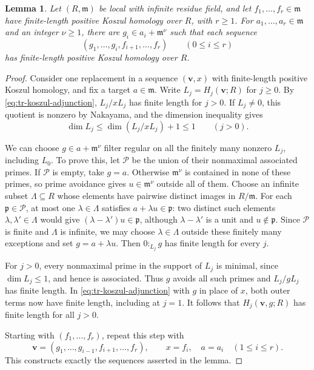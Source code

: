 \documentclass[11pt,reqno]{amsart}
\numberwithin{equation}{section}
\newtheorem{lemma}[theorem]{Lemma}
\theoremstyle{definition}
\begin{document}
\begin{lemma}
\label{lem:tr-successive-approximation}
Let $(R,\mathfrak m)$ be local with infinite residue field, and let
$f_1,\ldots,f_r\in\mathfrak m$ have finite-length positive Koszul
homology over $R$, with $r\ge1$.
For $a_1,\ldots,a_r\in\mathfrak m$ and an integer $\nu\geq1$, there are
$g_i\in a_i+\mathfrak m^\nu$ such that each sequence
\[
 (g_1,\ldots,g_i,f_{i+1},\ldots,f_r)\qquad(0\leq i\leq r)
\]
has finite-length positive Koszul homology over $R$.
\end{lemma}
\begin{proof}
Consider one replacement in a sequence $(\mathbf v,x)$ with
finite-length positive Koszul homology, and fix a target $a\in\mathfrak m$.
Write
$L_j=H_j(\mathbf v;R)$ for $j\geq0$.
By \eqref{eq:tr-koszul-adjunction}, $L_j/xL_j$ has finite length
for $j>0$. If $L_j\ne0$, this quotient is nonzero by Nakayama,
and the dimension inequality gives
\[
 \dim L_j\leq\dim(L_j/xL_j)+1\leq1\qquad(j>0).
\]

We can choose $g\in a+\mathfrak m^\nu$ filter regular on all the
finitely many nonzero $L_j$, including $L_0$.
To prove this, let $\mathcal P$ be the union of their nonmaximal
associated primes. If $\mathcal P$ is empty, take $g=a$.
Otherwise $\mathfrak m^\nu$ is contained in none of these primes,
so prime avoidance gives $u\in\mathfrak m^\nu$ outside all of them.
Choose an infinite subset $\Lambda\subseteq R$ whose elements have
pairwise distinct images in $R/\mathfrak m$.
For each $\mathfrak p\in\mathcal P$, at most one $\lambda\in\Lambda$
satisfies $a+\lambda u\in\mathfrak p$: two distinct such elements
$\lambda,\lambda'\in\Lambda$ would give
$(\lambda-\lambda')u\in\mathfrak p$, although $\lambda-\lambda'$
is a unit and $u\notin\mathfrak p$.
Since $\mathcal P$ is finite and $\Lambda$ is infinite, we may choose
$\lambda\in\Lambda$ outside these finitely many exceptions and set
$g=a+\lambda u$.
Then $0:_{L_j}g$ has finite length for every $j$.

For $j>0$, every nonmaximal prime in the support of $L_j$ is
minimal, since $\dim L_j\leq1$, and hence is associated.
Thus $g$ avoids all such primes and $L_j/gL_j$ has finite length.
In \eqref{eq:tr-koszul-adjunction} with $g$ in place of $x$,
both outer terms now have finite length, including at $j=1$.
It follows that $H_j(\mathbf v,g;R)$ has finite length for all $j>0$.

Starting with $(f_1,\ldots,f_r)$, repeat this step with
\[
 \mathbf v=(g_1,\ldots,g_{i-1},f_{i+1},\ldots,f_r),
 \qquad x=f_i,\quad a=a_i\quad(1\leq i\leq r).
\]
This constructs exactly the sequences asserted in the lemma.
\end{proof}
\end{document}
